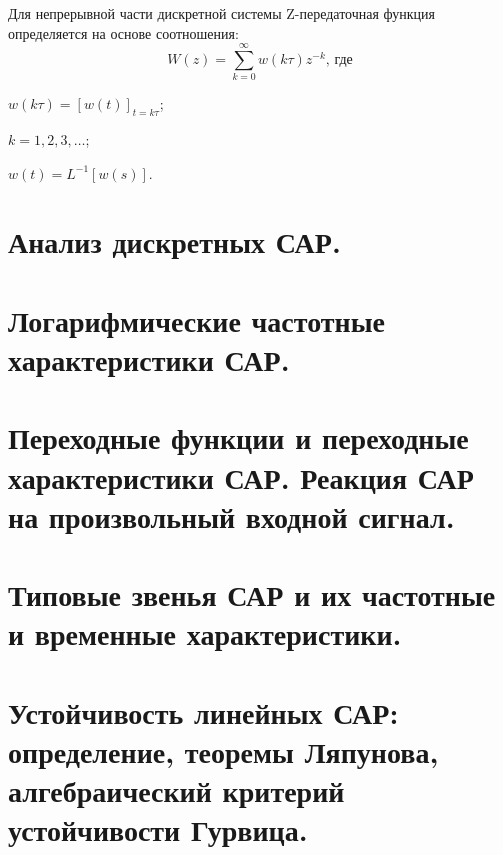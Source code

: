 \documentclass[unicode, 12pt, a4paper, oneside]{article}
\begin{document}
Для непрерывной части дискретной системы Z-передаточная функция определяется на основе соотношения:
\begin{equation}
W(z) = \sum_{k=0}^{\infty} w(k\tau) z^{-k} \text{, где}
\end{equation}
\par $ w(k\tau) = [w(t)]_{t=k\tau} $;\nopagebreak
\par $ k = 1, 2, 3, \ldots $;
\par $ w(t) = L^{-1} [w(s)] $.

\section{Анализ дискретных САР.}

\section{Логарифмические частотные характеристики САР.}

\section{Переходные функции и переходные характеристики САР. Реакция САР на произвольный входной сигнал.}

\section{Типовые звенья САР и их частотные и временные характеристики.}

\section{Устойчивость линейных САР: определение, теоремы Ляпунова, алгебраический критерий устойчивости Гурвица.}

\end{document}
